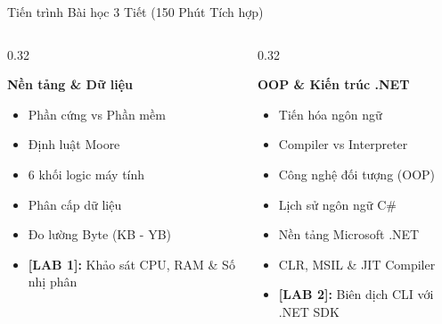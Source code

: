 \documentclass[aspectratio=169, 10pt]{beamer}
\begin{document}
\begin{frame}{Tiến trình Bài học 3 Tiết (150 Phút Tích hợp)}
  \begin{columns}[T]
    \begin{column}{0.32\textwidth}
      \begin{tcolorbox}[colback=UniNavy!5,colframe=UniNavy,title=\textbf{TIẾT 1 (50')},fonttitle=\small\bfseries]
        \textbf{Nền tảng \& Dữ liệu}
        \begin{itemize}\scriptsize
          \item Phần cứng vs Phần mềm
          \item Định luật Moore
          \item 6 khối logic máy tính
          \item Phân cấp dữ liệu
          \item Đo lường Byte (KB - YB)
          \item \textbf{[LAB 1]:} Khảo sát CPU, RAM \& Số nhị phân
        \end{itemize}
      \end{tcolorbox}
    \end{column}

    \begin{column}{0.32\textwidth}
      \begin{tcolorbox}[colback=CSharpPurple!5,colframe=CSharpPurple,title=\textbf{TIẾT 2 (50')},fonttitle=\small\bfseries]
        \textbf{OOP \& Kiến trúc .NET}
        \begin{itemize}\scriptsize
          \item Tiến hóa ngôn ngữ
          \item Compiler vs Interpreter
          \item Công nghệ đối tượng (OOP)
          \item Lịch sử ngôn ngữ C\#
          \item Nền tảng Microsoft .NET
          \item CLR, MSIL \& JIT Compiler
          \item \textbf{[LAB 2]:} Biên dịch CLI với .NET SDK
        \end{itemize}
      \end{tcolorbox}
    \end{column}


\end{columns}
\end{frame}
\end{document}
